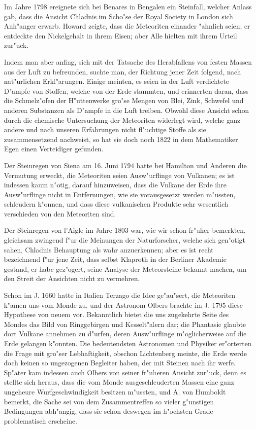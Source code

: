 \documentclass[a4paper, 11pt, oneside, german]{article}
\begin{document}
Im Jahre 1798 ereignete sich bei Benares in Bengalen ein Steinfall, welcher Anlass gab, dass die Ansicht Chladnis im Scho"se der Royal Society in London sich Anh"anger erwarb. Howard zeigte, dass die Meteoriten einander "ahnlich seien; er entdeckte den Nickelgehalt in ihrem Eisen; aber Alle hielten mit ihrem Urteil zur"uck.

Indem man aber anfing, sich mit der Tatsache des Herabfallens von festen Massen aus der Luft zu befreunden, suchte man, der Richtung jener Zeit folgend, nach nat"urlichen Erkl"arungen. Einige meinten, es seien in der Luft verdichtete D"ampfe von Stoffen, welche von der Erde stammten, und erinnerten daran, dass die Schmelz"ofen der H"uttenwerke gro"se Mengen von Blei, Zink, Schwefel und anderen Substanzen als D"ampfe in die Luft treiben. Obwohl diese Ansicht schon durch die chemische Untersuchung der Meteoriten widerlegt wird, welche ganz andere und nach unseren Erfahrungen nicht fl"uchtige Stoffe als sie zusammensetzend nachweist, so hat sie doch noch 1822 in dem Mathematiker Egen einen Verteidiger gefunden.

Der Steinregen von Siena am 16. Juni 1794 hatte bei Hamilton und Anderen die Vermutung erweckt, die Meteoriten seien Ausw"urflinge von Vulkanen; es ist indessen kaum n"otig, darauf hinzuweisen, dass die Vulkane der Erde ihre Ausw"urflinge nicht in Entfernungen, wie sie vorausgesetzt werden m"ussten, schleudern k"onnen, und dass diese vulkanischen Produkte sehr wesentlich verschieden von den Meteoriten sind.

Der Steinregen von l'Aigle im Jahre 1803 war, wie wir schon fr"uher bemerkten, gleichsam zwingend f"ur die Meinungen der Naturforscher, welche sich gen"otigt sahen, Chladnis Behauptung als wahr anzuerkennen; aber es ist recht bezeichnend f"ur jene Zeit, dass selbst Klaproth in der Berliner Akademie gestand, er habe gez"ogert, seine Analyse der Meteorsteine bekannt machen, um den Streit der Ansichten nicht zu vermehren.

Schon im J. 1660 hatte in Italien Terzago die Idee ge"au"sert, die Meteoriten k"amen uns vom Monde zu, und der Astronom Olbers brachte im J. 1795 diese Hypothese von neuem vor. Bekanntlich bietet die uns zugekehrte Seite des Mondes das Bild von Ringgebirgen und Kesselt"alern dar; die Phantasie glaubte dort Vulkane annehmen zu d"urfen, deren Ausw"urflinge m"oglicherweise auf die Erde gelangen k"onnten. Die bedeutendsten Astronomen und Physiker er"orterten die Frage mit gro"ser Lebhaftigkeit, obschon Lichtenberg meinte, die Erde werde doch keinen so ungezogenen Begleiter haben, der mit Steinen nach ihr werfe. Sp"ater kam indessen auch Olbers von seiner fr"uheren Ansicht zur"uck, denn es stellte sich heraus, dass die vom Monde ausgeschleuderten Massen eine ganz ungeheure Wurfgeschwindigkeit besitzen m"ussten, und A. von Humboldt bemerkt, die Sache sei von dem Zusammentreffen so vieler g"unstigen Bedingungen abh"angig, dass sie schon deswegen im h"ochsten Grade problematisch erscheine.
\end{document}
